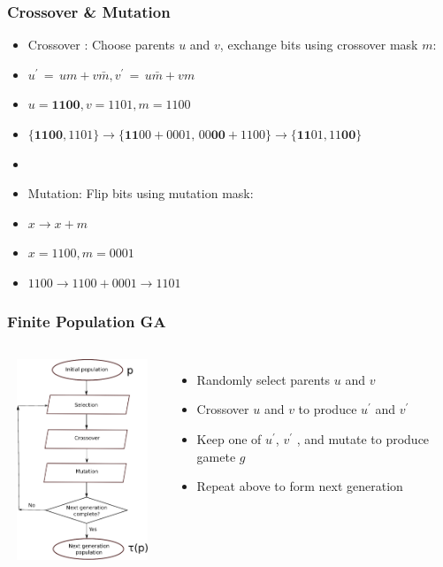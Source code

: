\documentclass[aspectratio=169]{beamer}
\begin{document}
  \begin{frame}
    \frametitle{Crossover \& Mutation}
    \begin{itemize}
      \item{Crossover : Choose parents $u$ and $v$, exchange bits using crossover mask $m$: }
      \item{$u^\prime \,=\, um + v\bar{m} , v^\prime \,=\, u\bar{m} + vm$}      
      \item{$u = \bm{1100}, v = 1101, m = 1100$}
      \item{$\{\bm{1100}, 1101\} \to \{\bm{11}00 + 0001,\, 00\bm{00} + 1100\} \to \{\bm{11}01, 11\bm{00}\}$}
      \item
      \item{Mutation: Flip bits using mutation mask:}
      \item{$x \to x + m$}
      \item{$x = 1100, m = 0001$}
      \item{$1100 \to 1100 + 0001 \to 1101$}
    \end{itemize}
  \end{frame}
  
  \begin{frame}
    \frametitle{Finite Population GA}
    \begin{columns}
             \centering
             \includegraphics[height=6cm, width=5cm]{figures/eps/GA.eps}
	    \begin{itemize}
              \item{Randomly select parents $u$ and $v$ }
              \item{Crossover $u$ and $v$ to produce $u^\prime$ and $v^\prime$ }
              \item{Keep one of $u^\prime$, $v^\prime$ , and mutate to produce gamete $g$}
              \item{Repeat above to form next generation}              
	    \end{itemize}
         \end{columns} 
  \end{frame}
  
\end{document}
